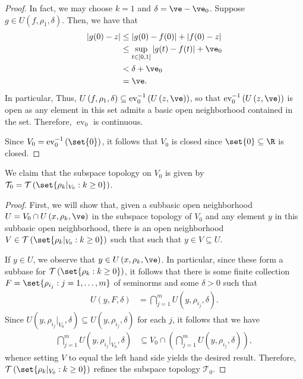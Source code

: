\documentclass[10pt]{mypackage}
\begin{document}
\begin{enumerate}[(i)]
\begin{proof}
      In fact, we may choose $k = 1$ and $\delta = \ve - \ve_0$. Suppose $g\in U\left( f,\rho_1, \delta\right)$. Then, we have that 
      \begin{align*}
        \left\vert g(0) - z \right\vert &\leq \left\vert g(0) - f(0) \right\vert + \left\vert f(0) - z \right\vert\\
                                        &\leq \sup_{t\in [0,1]} \left\vert g(t)-f(t) \right\vert + \ve_0\\
                                        &< \delta + \ve_0\\
                                        &= \ve.
      \end{align*}
      In particular, Thus, $U\left( f,\rho_1,\delta \right)\subseteq \operatorname{ev}_0^{-1}\left( U\left( z,\ve \right) \right)$, so that $\operatorname{ev}_0^{-1}\left( U\left( z,\ve \right) \right)$ is open as any element in this set admits a basic open neighborhood contained in the set. Therefore, $\operatorname{ev}_0$ is continuous.

      Since $V_0 = \operatorname{ev}_0^{-1}\left( \set{0} \right)$, it follows that $V_0$ is closed since $\set{0}\subseteq \R$ is closed.
    \end{proof}
    We claim that the subspace topology on $V_0$ is given by $\mathcal{T}_0 = \mathcal{T}\left( \set{\rho_k\vert_{V_0} : k\geq 0} \right)$.
    \begin{proof}
      First, we will show that, given a subbasic open neighborhood $U = V_0\cap U\left( x,\rho_k,\ve \right)$ in the subspace topology of $V_0$ and any element $y$ in this subbasic open neighborhood, there is an open neighborhood $V\in \mathcal{T}\left( \set{\rho_k\vert_{V_0} : k\geq 0} \right)$ such that such that $y\in V\subseteq U$.

      If $y\in U$, we observe that $y\in U\left( x,\rho_k,\ve \right)$. In particular, since these form a subbase for $\mathcal{T}\left( \set{\rho_k : k\geq 0} \right)$, it follows that there is some finite collection $F = \set{\rho_{i_j} : j=1,\dots,m}$ of seminorms and some $\delta > 0$ such that 
      \begin{align*}
        U\left( y,F,\delta \right) &= \bigcap_{j=1}^{m} U\left( y,\rho_{i_j},\delta \right).
      \end{align*}
      Since $U\left( y,\rho_{i_j}|_{V_0},\delta \right)\subseteq U\left( y,\rho_{i_j},\delta \right)$ for each $j$, it follows that we have
      \begin{align*}
        \bigcap_{j=1}^{m} U\left( y,\rho_{i_j}|_{V_0},\delta \right) &\subseteq V_0 \cap \left( \bigcap_{j=1}^{m}U\left( y,\rho_{i_j},\delta \right) \right),
      \end{align*}
      whence setting $V$ to equal the left hand side yields the desired result. Therefore, $ \mathcal{T}\left( \set{\rho_{k}\vert_{V_0} : k\geq 0} \right) $ refines the subspace topology $ \mathcal{T}_0 $.


\end{proof}
\end{enumerate}
\end{document}
